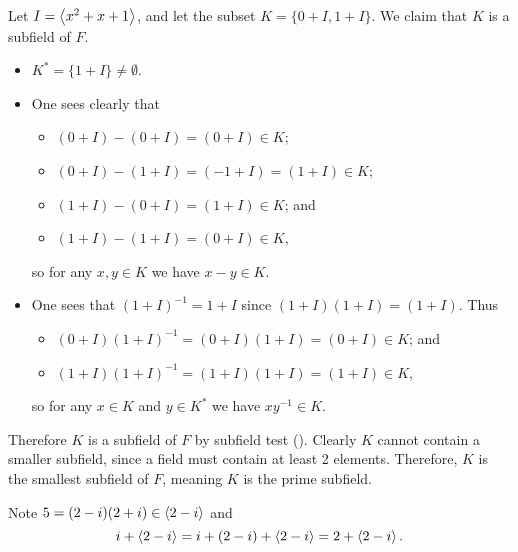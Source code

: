 \begin{questions}
    Let $I = \left\langle x^2+x+1\right\rangle$, and let the subset $K = \{0 + I, 1 + I\}$. We claim that $K$ is a subfield of $F$.
    \begin{itemize}
        \item $K^\ast = \{1 + I\} \neq \emptyset$.
        \item One sees clearly that
        \begin{itemize}
            \item $(0 + I) - (0 + I) = (0 + I) \in K$;
            \item $(0 + I) - (1 + I) = (-1 + I) = (1 + I) \in K$;
            \item $(1 + I) - (0 + I) = (1 + I) \in K$; and
            \item $(1 + I) - (1 + I) = (0 + I) \in K$,
        \end{itemize}
        so for any $x, y \in K$ we have $x - y \in K$.
        \item One sees that $(1+I)^{-1} = 1+I$ since $(1+I)(1+I) = (1+I)$. Thus
        \begin{itemize}
            \item $(0+I)(1+I)^{-1} = (0+I)(1+I) = (0+I) \in K$; and
            \item $(1+I)(1+I)^{-1} = (1+I)(1+I) = (1+I) \in K$,
        \end{itemize}
        so for any $x \in K$ and $y \in K^\ast$ we have $xy^{-1} \in K$.
    \end{itemize}
    Therefore $K$ is a subfield of $F$ by subfield test (). Clearly $K$ cannot contain a smaller subfield, since a field must contain at least 2 elements. Therefore, $K$ is the smallest subfield of $F$, meaning $K$ is the prime subfield.
    
    \item \begin{partquestions}{\roman*}
        \item Note $5 = (2-i)(2+i) \in \left\langle2-i\right\rangle$ and
        \[
            i + \left\langle2-i\right\rangle = i + (2-i) + \left\langle2-i\right\rangle = 2 + \left\langle2-i\right\rangle.
        \]
        

\end{partquestions}
\end{questions}
